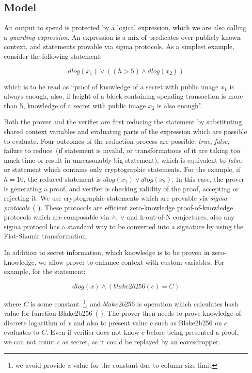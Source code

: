 \documentclass[]{llncs}
\newcommand{\authnote}[2]{\marginpar{\parbox{\marginparwidth}{\tiny %
  \textsf{#1 {\textcolor{blue}{notes: #2}}}}}%
  \textcolor{blue}{\textbf{\dag}}}
\newcommand{\authnote}[2]{
  \textsf{#1 \textcolor{blue}{: #2}}}
\newcommand{\authnote}[2]{}
\newcommand{\knote}[1]{{\authnote{\textcolor{green}{kushti notes}}{#1}}}
\begin{document}
\subsection{Model}

An output to spend is protected by a logical expression, which we are also calling a {\em guarding expression}. An expression is a mix of predicates over publicly known context, and statements provable via sigma protocols. As a simplest example, consider the following statement:

\begin{equation}
\label{eq:example1}
dlog(x_1) \lor ((h > 5) \land dlog(x_2))
\end{equation}

which is to be read as ``proof of knowledge of a secret with public image $x_1$ is always enough, also, if height of a block containing spending transaction is more than 5, knowledge of a secret with public image $x_2$ is also enough''.

Both the prover and the verifier are first reducing the statement by substituting shared context variables and evaluating parts of the expression which are possible to evaluate. Four outcomes of the reduction process are possible: {\em true}, {\em false}, failure to reduce~(if statement is invalid, or transformations of it are taking too much time or result in unreasonably big statement), which is equivalent to {\em false}; or statement which contains only cryptographic statements. For the example, if $h = 10$, the reduced statement is $dlog(x_1) \lor dlog(x_2)$. In this case, the prover is generating a proof, and verifier is checking validity of the proof, accepting or rejecting it. We use cryptographic statements which are provable via {\em sigma protocols}~(\knote{links}). These protocols are efficient zero-knowledge \knote{special honest verifier ZK actually} proof-of-knowledge protocols which are composable via $\land$, $\lor$ and k-out-of-N conjectures, also any sigma protocol has a standard way to be converted into a signature by using the Fiat-Shamir transformation. 

In addition to secret information, which knowledge is to be proven in zero-knowledge, we allow prover to enhance context with custom variables. For example, for the statement:

$$dlog(x) \land (blake2b256(c) = C)$$

where $C$ is some constant~\footnote{we avoid provide a value for the constant due to column size limit}, and $blake2b256$ is operation which calculates hash value for function Blake2b256~(\knote{link}). The prover then needs to prove knowledge of discrete logarithm of $x$ and also to present value $c$ such as Blake2b256 on $c$ evaluates to $C$. Even if verifier does not know $c$ before being presented a proof, we can not count $c$ as secret, as it could be replayed by an eavesdropper.   
\end{document}
